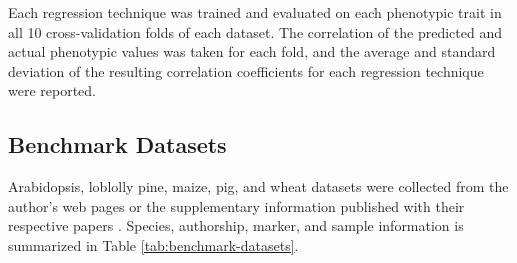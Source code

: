 \documentclass[9pt,twocolumn,twoside]{g3_article/gsag3jnl}
\begin{document}
Each regression technique was trained and evaluated on each phenotypic trait in all 10 cross-validation folds of each dataset.
The correlation of the predicted and actual phenotypic values was taken for each fold, and the average and 
standard deviation of the resulting correlation coefficients for each regression technique were reported.
 

\subsection*{Benchmark Datasets}

Arabidopsis, loblolly pine, maize, pig, and wheat datasets were collected from the author's web pages
or the supplementary information published with their respective papers \citep{loudet2002, resende2012, crossa2010, cleveland2012, thavamanikumar2015}.
Species, authorship, marker, and sample information is summarized in Table \ref{tab:benchmark-datasets}.
\end{document}
